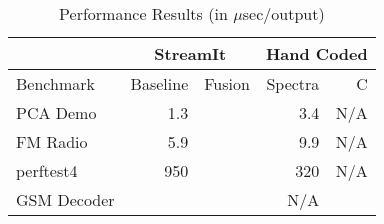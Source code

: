 \begin{table}[t]
\begin{center}
\scriptsize
\begin{tabular}{|l|r|r|r|r|} \hline
& \multicolumn{2}{|c|}{StreamIt} &  \multicolumn{2}{|c|}{Hand Coded}\\
\hline 
Benchmark & Baseline & Fusion & Spectra & C \\
\hline \hline
PCA Demo & 1.3 & & 3.4 & N/A\\
\hline
FM Radio & 5.9 & & 9.9 & N/A\\
\hline
perftest4 & 950 & & 320& N/A\\
\hline
GSM Decoder & & & N/A & \\
\hline
\end{tabular}
\vspace{-6pt}
\caption{\protect\small Performance Results (in $\mu$sec/output)}
\label{tab:performance}
\end{center}
\end{table}